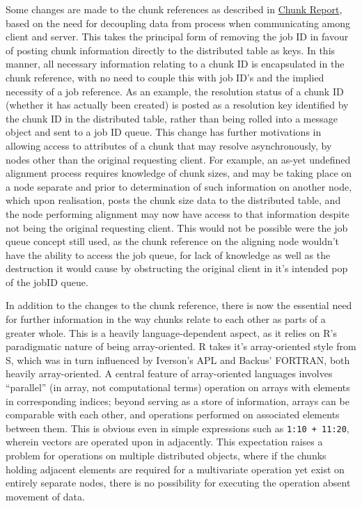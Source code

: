 Some changes are made to the chunk references as described in
\href{chunk-report.pdf}{Chunk Report}, based on the need for decoupling data
from process when communicating among client and server.
This takes the principal form of removing the job ID in favour of posting chunk
information directly to the distributed table as keys.
In this manner, all necessary information relating to a chunk ID is
encapsulated in the chunk reference, with no need to couple this with job ID's
and the implied necessity of a job reference.
As an example, the resolution status of a chunk ID (whether it has actually
been created) is posted as a resolution key identified by the chunk ID in the
distributed table, rather than being rolled into a message object and sent to a
job ID queue.
This change has further motivations in allowing access to attributes of a chunk
that may resolve asynchronously, by nodes other than the original requesting
client.
For example, an as-yet undefined alignment process requires knowledge of chunk
sizes, and may be taking place on a node separate and prior to determination of
such information on another node, which upon realisation, posts the chunk size
data to the distributed table, and the node performing alignment may now have
access to that information despite not being the original requesting client.
This would not be possible were the job queue concept still used, as the chunk
reference on the aligning node wouldn't have the ability to access the job
queue, for lack of knowledge as well as the destruction it would cause by
obstructing the original client in it's intended pop of the jobID queue.

In addition to the changes to the chunk reference, there is now the essential
need for further information in the way chunks relate to each other as parts of
a greater whole.
This is a heavily language-dependent aspect, as it relies on R's paradigmatic
nature of being array-oriented.
R takes it's array-oriented style from S, which was in turn influenced by
Iverson's APL and Backus' FORTRAN, both heavily
array-oriented\cite{becker1994shistory}\cite{iverson2007notation}.
A central feature of array-oriented languages involves ``parallel'' (in array,
not computational terms) operation on arrays with elements in corresponding
indices; beyond serving as a store of information, arrays can be comparable
with each other, and operations performed on associated elements between them.
This is obvious even in simple expressions such as 
\texttt{1:10 + 11:20}, wherein vectors are operated upon in
adjacently.
This expectation raises a problem for operations on multiple distributed
objects, where if the chunks holding adjacent elements are required for a
multivariate operation yet exist on entirely separate nodes, there is no
possibility for executing the operation absent movement of data.

